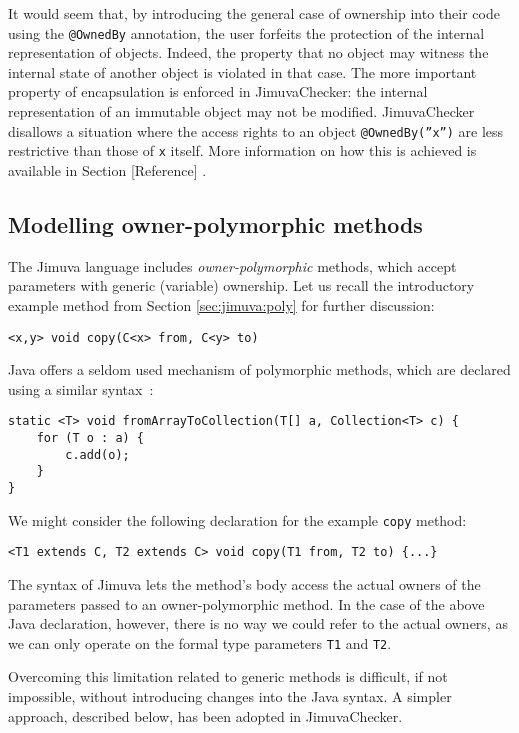 \documentclass{pracamgr}
\theoremstyle{all}
\newcommand{\todo}[1]{{\color{red} [#1] }}
\begin{document}
It would seem that, by introducing the general case of ownership into
their code using the \texttt{@OwnedBy} annotation, the user forfeits
the protection of the internal representation of objects. Indeed, the
property that no object may witness the internal state of another
object is violated in that case. The more important property of
encapsulation is enforced in JimuvaChecker: the internal
representation of an immutable object may not be
modified. JimuvaChecker disallows a situation where the access rights
to an object \texttt{@OwnedBy(''x'')} are less restrictive than those
of \texttt{x} itself. More information on how this is achieved is
available in Section \todo{Reference}.

\subsection{Modelling owner-polymorphic methods}

The Jimuva language includes \emph{owner-polymorphic} methods, which
accept parameters with generic (variable) ownership. Let us recall the
introductory example method from Section \ref{sec:jimuva:poly} for
further discussion:
\begin{center}
  \texttt{<x,y> void copy(C<x> from, C<y> to)}
\end{center}

Java offers a seldom used mechanism of polymorphic methods, which are
declared using a similar syntax~\cite{genericmethods}:
\begin{lstlisting}
static <T> void fromArrayToCollection(T[] a, Collection<T> c) {
    for (T o : a) {
        c.add(o);
    }
}
\end{lstlisting}

We might consider the following declaration for the example
\texttt{copy} method:
\begin{lstlisting}
<T1 extends C, T2 extends C> void copy(T1 from, T2 to) {...}
\end{lstlisting}
The syntax of Jimuva lets the method's body access the actual owners
of the parameters passed to an owner-polymorphic method. In the case
of the above Java declaration, however, there is no way we could refer
to the actual owners, as we can only operate on the formal type
parameters \texttt{T1} and \texttt{T2}.

Overcoming this limitation related to generic methods is difficult, if
not impossible, without introducing changes into the Java syntax. A
simpler approach, described below, has been adopted in JimuvaChecker.
\end{document}
